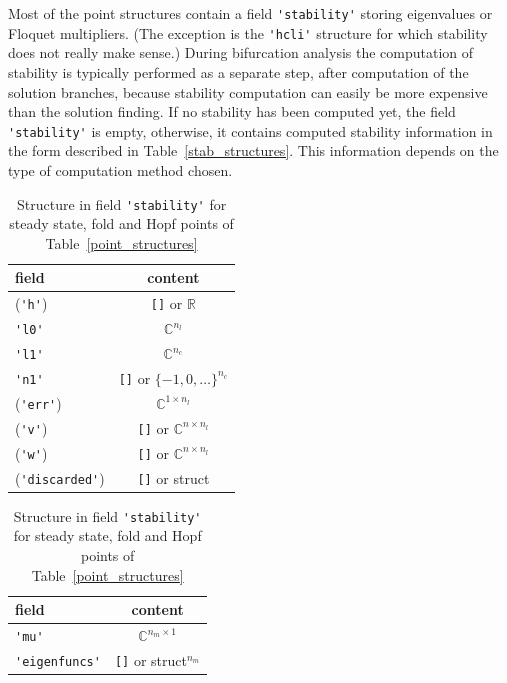 \documentclass[10pt]{scrartcl}
\newcommand{\RR}{\mathbb{R}}
\newcommand{\CC}{\mathbb{C}}
\newcommand{\blist}[1]{\mbox{\lstinline!#1!}}
\begin{document}
Most of the point structures contain a 
field \blist{'stability'} storing eigenvalues or Floquet multipliers. (The exception is  
the \blist{'hcli'} structure for which stability does not really make
sense.) During bifurcation analysis the computation of stability is
typically performed as a separate step, after computation of the
solution branches, because stability computation can easily be more
expensive than the solution finding. If no stability has been computed
yet, the field \blist{'stability'} is empty, otherwise, it contains
computed stability information in the form described in
Table~\ref{stab_structures}. This information depends on the type of
computation method chosen.

\begin{table}[htbp]
  \begin{center}
    \begin{subtable}[t]{0.4\textwidth}
      \begin{tabular}[t]{lc}\hline\noalign{\smallskip}
        field & content    \\\hline\noalign{\smallskip}
        (\blist{'h'})     & \blist{[]} or $\RR$  \\
        \blist{'l0'}    & $\CC^{n_l}$ \\
        \blist{'l1'}    & $\CC^{n_c}$ \\
        \blist{'n1'}    & \blist{[]} or $\{-1,0,\ldots\}^{n_c}$ \\
        (\blist{'err'})    & $\CC^{1\times n_l}$ \\
        (\blist{'v'}) &\blist{[]} or $\CC^{n\times n_l}$ \\
        (\blist{'w'}) &\blist{[]} or $\CC^{n\times n_l}$ \\
        (\blist{'discarded'}) &\blist{[]} or struct \\\hline
      \end{tabular}
      \caption{Structure in field \blist{'stability'} for steady
        state, fold and Hopf points of Table~\ref{point_structures}}
    \end{subtable}\qquad
    \begin{subtable}[t]{0.35\textwidth}
      \begin{tabular}[t]{lc}\hline\noalign{\smallskip}
        field & content     \\\hline\noalign{\smallskip}
        \blist{'mu'}    & $\CC^{n_m\times 1}$ \\
        \blist{'eigenfuncs'} & \blist{[]} or struct$^{n_m}$\\

\end{tabular}
\end{subtable}
\end{center}
\end{table}
\end{document}
